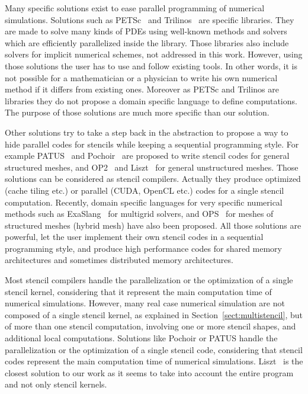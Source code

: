 
Many specific solutions exist to ease parallel programming of numerical simulations. Solutions such as PETSc~\cite{petsc-efficient} and Trilinos~\cite{Trilinos-Overview} are specific libraries. They are made to solve many kinds of PDEs using well-known methods and solvers which are efficiently parallelized inside the library. Those libraries also include solvers for implicit numerical schemes, not addressed in this work. However, using those solutions the user has to use and follow existing tools. In other words, it is not possible for a mathematician or a physician to write his own numerical method if it differs from existing ones. Moreover as PETSc and Trilinos are libraries they do not propose a domain specific language to define computations. The purpose of those solutions are much more specific than our solution.

Other solutions try to take a step back in the abstraction to propose a way to hide parallel codes for stencils while keeping a sequential programming style. For example PATUS~\cite{citeulike12258902} and Pochoir~\cite{spaaTangCKLL11} are proposed to write stencil codes for general structured meshes, and OP2~\cite{Giles2011} and Liszt~\cite{DeVito2011LDS} for general unstructured meshes. Those solutions can be considered as stencil compilers. Actually they produce optimized (cache tiling etc.) or parallel (CUDA, OpenCL etc.) codes for a single stencil computation.
Recently, domain specific languages for very specific numerical methods such as ExaSlang~\cite{Schmitt:2014:EDL:2691166.2691171} for multigrid solvers, and OPS~\cite{Reguly:2014:ODS:2691166.2691173} for meshes of structured meshes (hybrid mesh) have also been proposed. 
All those solutions are powerful, let the user implement their own stencil codes in a sequential programming style, and produce high performance codes for shared memory architectures and sometimes distributed memory architectures. 

Most stencil compilers handle the parallelization or the optimization of a single stencil kernel, considering that it represent the main computation time of numerical simulations. However, many real case numerical simulation are not composed of a single stencil kernel, as explained in Section~\ref{sect:multistencil}, but of more than one stencil computation, involving one or more stencil shapes, and additional local computations. Solutions like Pochoir or PATUS handle the parallelization or the optimization of a single stencil code, considering that stencil codes represent the main computation time of numerical simulations. Liszt~\cite{DeVito2011LDS} is the closest solution to our work as it seems to take into account the entire program and not only stencil kernels. 

